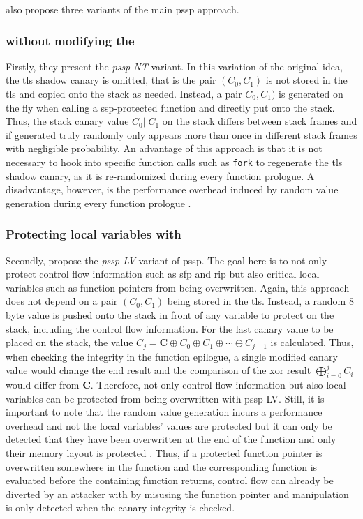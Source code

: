  also propose three variants of the main \gls{pssp} approach.

\subsubsection{ without modifying the }
\label{subsubsec:p-ssp-nt}

Firstly, they present the \emph{\acs{pssp}-NT} variant.
In this variation of the original idea, the \acs{tls} shadow canary is omitted, that is the pair $ (C_0, C_1) $ is not stored in the \gls{tls} and copied onto the stack as needed.
Instead, a pair $ C_0, C_1) $ is generated on the fly when calling a \acs{ssp}-protected function and directly put onto the stack.
Thus, the stack canary value $ C_0 || C_1 $ on the stack differs between stack frames and if generated truly randomly only appears more than once in different stack frames with negligible probability.
An advantage of this approach is that it is not necessary to hook into specific function calls such as \texttt{fork} to regenerate the \acs{tls} shadow canary, as it is re-randomized during every function prologue.
A disadvantage, however, is the performance overhead induced by random value generation during every function prologue \cite[247]{Wang2018}.

\subsubsection{Protecting local variables with }
\label{subsubsec:p-ssp-lv}

Secondly, \citeauthor{Wang2018} propose the \emph{\acs{pssp}-LV} variant of \gls{pssp}.
The goal here is to not only protect control flow information such as \gls{sfp} and \gls{rip} but also critical local variables such as function pointers from being overwritten.
Again, this approach does not depend on a pair $ (C_0, C_1) $ being stored in the \gls{tls}.
Instead, a random 8 byte value is pushed onto the stack in front of any variable to protect on the stack, including the control flow information.
For the last canary value to be placed on the stack, the value $ C_j = \textbf{C} \oplus C_0 \oplus C_1 \oplus \cdots \oplus C_{j - 1} $ is calculated.
Thus, when checking the integrity in the function epilogue, a single modified canary value would change the end result and the comparison of the \acs{xor} result $ \bigoplus_{i = 0}^{j}{C_i} $ would differ from \textbf{C}.
Therefore, not only control flow information but also local variables can be protected from being overwritten with \acs{pssp}-LV.
Still, it is important to note that the random value generation incurs a performance overhead and not the local variables' values are protected but it can only be detected that they have been overwritten at the end of the function and only their memory layout is protected \cite[247]{Wang2018}.
Thus, if a protected function pointer is overwritten somewhere in the function and the corresponding function is evaluated before the containing function returns, control flow can already be diverted by an attacker with by misusing the function pointer and manipulation is only detected when the canary integrity is checked.

